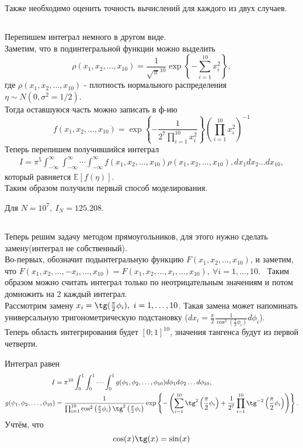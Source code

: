 \documentclass[11pt]{article}
\begin{document}
Также необходимо оценить точность вычислений для каждого из двух случаев.

\subsection{}
Перепишем интеграл немного в другом виде.\\
Заметим, что в подинтегральной функции можно выделить
$$
    \rho(x_1,x_2,\dots,x_{10}) = \frac{1}{\sqrt{\pi}^{10}}\exp\left\{ -\sum_{i=1}^{10}x_i^2 \right\},
$$
где $\rho(x_1,x_2,\dots,x_{10})$ - плотность нормального распределения $\eta \sim N(0, \sigma^2 = 1/2)$. \\
Тогда оставшуюся часть можно записать в ф-ию 
$$
    f(x_1,x_2,\dots,x_{10}) = \exp\left\{- \frac{1}{2^7 \prod_{i=1}^{10}x_i^2} \right\} ({\prod_{i=1}^{10}x_i^2})^{-1} 
$$
Теперь перепишем получившийся интеграл
$$
\begin{aligned}
I= \pi^5\int_{-\infty}^{\infty}\int_{-\infty}^{\infty}\cdots\int_{-\infty}^{\infty}f(x_1,x_2,\dots,x_{10}) \rho(x_1,x_2,\dots,x_{10}),
dx_1dx_2\dots dx_{10},
\end{aligned}
$$
который равняется $\mathbb{E}[f(\eta)]$. \\
Таким образом получили первый способ моделирования.

Для $N = 10 ^ 7,~ I_N = 125.208$.

\subsection{}
Теперь решим задачу методом прямоугольников, для этого нужно сделать замену(интеграл не собственный). \\
Во-первых, обозначит подынтегральную функцию $F(x_1,x_2,\ldots,x_{10})$, и заметим, что $F(x_1,x_2,\ldots,-x_i ,\ldots,x_{10}) = F(x_1,x_2,\ldots,x_i ,\ldots,x_{10}),~ \forall i=1, \ldots, 10$. \
Таким образом можно считать интеграл только по неотрицательным значениям и потом домножить на 2 каждый интеграл.  \\
Рассмотрим замену $x_i = \tg(\frac{\pi}{2}\phi_i),~i=1,\ldots,10$. Такая замена может напоминать универсальную тригонометрическую подстановку ($dx_i = \frac{\pi}{2} \frac{1}{\cos^{2}({\frac{\pi}{2}} \phi_i)}d\phi_i $). \\
Теперь область интегрирования будет $[0;1]^{10}$, значения тангенса будут из первой четверти. 


Интеграл равен
$$
\begin{aligned}
I &= \pi^{10}\int_{0}^1\int_{0}^{1}\cdots\int_{0}^1 g(\phi_1,\phi_2,\ldots,\phi_{10})d\phi_1d\phi_2\dots d\phi_{10}, \\
g(\phi_1,\phi_2,\ldots,\phi_{10}) &= \frac{1}{\prod^{10}_{i=1}\cos^2\left(\frac{\pi}{2}\phi_i\right) \tg^2\left(\frac{\pi}{2}\phi_i\right)}
\exp\left\{ -\left( \sum_{i=1}^{10}\tg^2\left(\frac{\pi}{2}\phi_i\right) + \frac{1}{2^7}\prod^{10}_{i=1} \tg^{-2}\left(\frac{\pi}{2}\phi_i\right) \right) \right\}.
\end{aligned}
$$
Учтём, что 
$$
    \cos(x) \tg(x) = \sin(x)
$$
\end{document}
